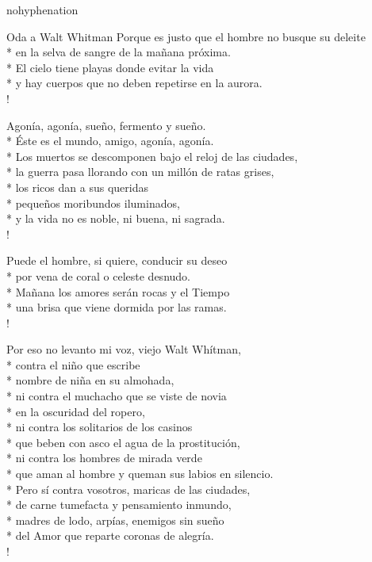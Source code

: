 \documentclass[
    a5paper,
    DIV=10,
    12pt,
    notitlepage,
    oneside,]
{scrbook} %
\begin{document}
\begin{hyphenrules}{nohyphenation}
\begin{poem}{Oda a Walt Whitman}{}{\vspace{-1em}}
Porque es justo que el hombre no busque su deleite\\*
en la selva de sangre de la mañana próxima.\\*
El cielo tiene playas donde evitar la vida\\*
y hay cuerpos que no deben repetirse en la aurora.\\!

Agonía, agonía, sueño, fermento y sueño.\\*
Éste es el mundo, amigo, agonía, agonía.\\*
Los muertos se descomponen bajo el reloj de las ciudades,\\*
la guerra pasa llorando con un millón de ratas grises,\\*
los ricos dan a sus queridas\\*
pequeños moribundos iluminados,\\*
y la vida no es noble, ni buena, ni sagrada.\\!

Puede el hombre, si quiere, conducir su deseo\\*
por vena de coral o celeste desnudo.\\*
Mañana los amores serán rocas y el Tiempo\\*
una brisa que viene dormida por las ramas.\\!

Por eso no levanto mi voz, viejo Walt Whítman,\\*
contra el niño que escribe\\*
nombre de niña en su almohada,\\*
ni contra el muchacho que se viste de novia\\*
en la oscuridad del ropero,\\*
ni contra los solitarios de los casinos\\*
que beben con asco el agua de la prostitución,\\*
ni contra los hombres de mirada verde\\*
que aman al hombre y queman sus labios en silencio.\\*
Pero sí contra vosotros, maricas de las ciudades,\\*
de carne tumefacta y pensamiento inmundo,\\*
madres de lodo, arpías, enemigos sin sueño\\*
del Amor que reparte coronas de alegría.\\!


\end{poem}
\end{hyphenrules}
\end{document}
